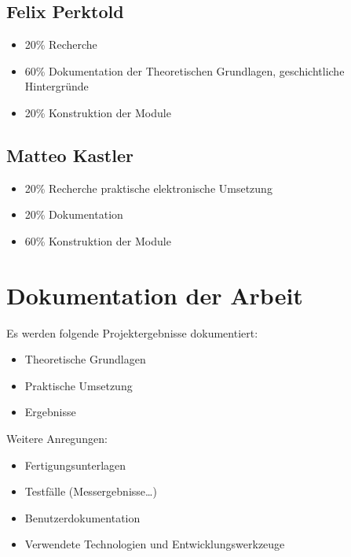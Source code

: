 \subsection{Felix Perktold}
\begin{itemize}
\item 20\% Recherche
\item 60\% Dokumentation der Theoretischen Grundlagen, geschichtliche Hintergründe
\item 20\% Konstruktion der Module
\end{itemize}

\subsection{Matteo Kastler}
\begin{itemize}
\item 20\% Recherche praktische elektronische Umsetzung
\item 20\% Dokumentation 
\item 60\% Konstruktion der Module
\end{itemize}

\section{Dokumentation der Arbeit}

Es werden folgende Projektergebnisse dokumentiert:

\begin{itemize}
\item Theoretische Grundlagen
\item Praktische Umsetzung
\item Ergebnisse
\end{itemize}

Weitere Anregungen:

\begin{itemize}
	\item Fertigungsunterlagen
	\item Testfälle (Messergebnisse…)
	\item Benutzerdokumentation
	\item Verwendete Technologien und Entwicklungswerkzeuge
\end{itemize}

